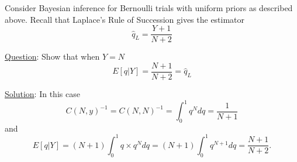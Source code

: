 \begin{example}\label{ex:beta}

Consider Bayesian inference for Bernoulli trials with uniform priors as described above. Recall that Laplace's Rule of Succession gives the estimator 
\begin{equation}
\hat{q}_L = \frac{Y+1}{N+2}
\end{equation}


\noindent
\underline{Question}: Show that when $Y=N$
\begin{equation*}
E[q|Y] = \frac{N+1}{N+2} = \hat{q}_L
\end{equation*}

\noindent
\underline{Solution}: 
In this case 
\begin{equation}
C(N,y)^{-1} =C(N,N)^{-1} = \int_0^1 q^N dq = \frac{1}{N+1}
\end{equation} 
and 
\begin{equation}
E[q|Y]  = (N+1) \int_0^1 q \times q^{N}dq = (N+1) \int_0^1 q^{N+1}dq  = \frac{N+1}{N+2}. 
\end{equation}


%



\end{example}


